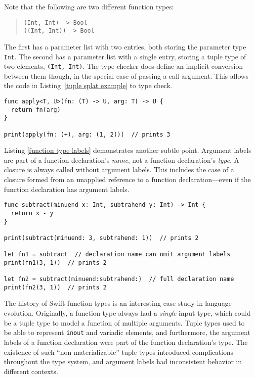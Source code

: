 \documentclass[a4paper,headsepline,bibliography=totoc,toc=flat,fleqn,twoside=semi]{scrbook}
\theoremstyle{definition}
\theoremstyle{definition}
\theoremstyle{definition}
\begin{document}
\medskip
Note that the following are two different function types:
\begin{quote}
\begin{verbatim}
(Int, Int) -> Bool
((Int, Int)) -> Bool
\end{verbatim}
\end{quote}
The first has a parameter list with two entries, both storing the parameter type \texttt{Int}. The second has a parameter list with a single entry, storing a tuple type of two elements, \texttt{(Int, Int)}. The type checker does define an implicit conversion between them though, in the special case of passing a call argument. This allows the code in Listing~\ref{tuple splat example} to type check.
\begin{listing}\label{tuple splat example}
\begin{Verbatim}
func apply<T, U>(fn: (T) -> U, arg: T) -> U {
  return fn(arg)
}

print(apply(fn: (+), arg: (1, 2)))  // prints 3
\end{Verbatim}
\end{listing}

Listing \ref{function type labels} demonstrates another subtle point. Argument labels are part of a function declaration's \emph{name}, not a function declaration's \emph{type}. A closure is always called without argument labels. This includes the case of a closure formed from an unapplied reference to a function declaration---even if the function declaration has argument labels.
\begin{listing}\label{function type labels}
\begin{Verbatim}
func subtract(minuend x: Int, subtrahend y: Int) -> Int {
  return x - y
}

print(subtract(minuend: 3, subtrahend: 1))  // prints 2

let fn1 = subtract  // declaration name can omit argument labels
print(fn1(3, 1))  // prints 2

let fn2 = subtract(minuend:subtrahend:)  // full declaration name
print(fn2(3, 1))  // prints 2
\end{Verbatim}
\end{listing}

The history of Swift function types is an interesting case study in language evolution. Originally, a function type always had a \emph{single} input type, which could be a tuple type to model a function of multiple arguments. Tuple types used to be able to represent \texttt{inout} and variadic elements, and furthermore, the argument labels of a function declaration were part of the function declaration's type. The existence of such ``non-materializable'' tuple types introduced complications throughout the type system, and argument labels had inconsistent behavior in different contexts.
\end{document}
